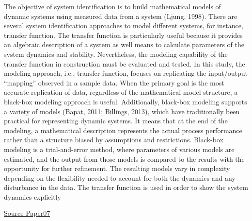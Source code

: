 \documentclass{article}
\begin{document}
The objective of system identification is to build mathematical models of dynamic systems using measured data from a system (Ljung, 1998).
There are several system identification approaches to model different systems, for instance, transfer function.
The transfer function is particularly useful because it provides an algebraic description of a system as well means to calculate parameters of the system dynamics and stability.
Nevertheless, the modeling capability of the transfer function in construction must be evaluated and tested.
In this study, the modeling approach, i.e., transfer function, focuses on replicating the input/output “mapping” observed in a sample data. When the primary goal is the most accurate replication of data, regardless of the mathematical model structure, a black-box modeling approach is useful.
Additionally, black-box modeling supports a variety of models (Bapat, 2011; Billings, 2013), which have traditionally been practical for representing dynamic systems.
It means that at the end of the modeling, a mathematical description represents the actual process performance rather than a structure biased by assumptions and restrictions.
Black-box modeling is a trial-and-error method, where parameters of various models are estimated, and the output from those models is compared to the results with the opportunity for further refinement. The resulting models vary in complexity depending on the flexibility needed to account for both the dynamics and any disturbance in the data.
The transfer function is used in order to show the system dynamics explicitly

\uline{Source Paper07}
\end{document}
